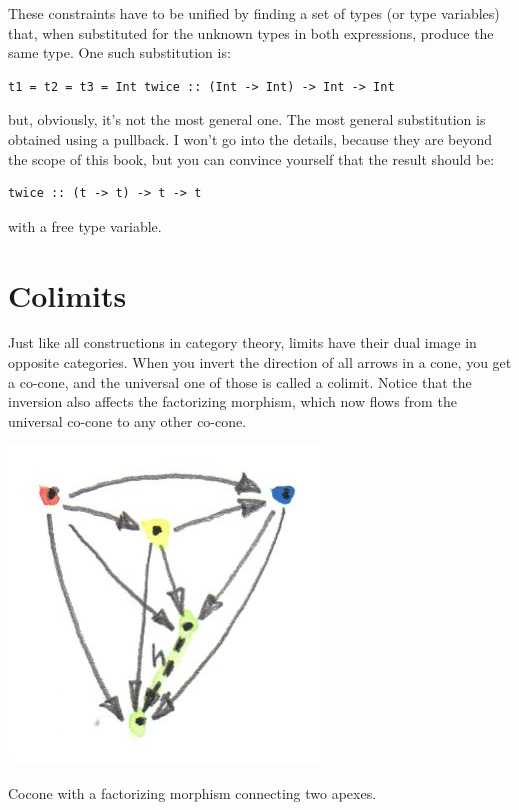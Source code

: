 These constraints have to be unified by finding a set of types (or type
variables) that, when substituted for the unknown types in both
expressions, produce the same type. One such substitution is:

\begin{verbatim}
t1 = t2 = t3 = Int twice :: (Int -> Int) -> Int -> Int
\end{verbatim}

but, obviously, it's not the most general one. The most general
substitution is obtained using a pullback. I won't go into the details,
because they are beyond the scope of this book, but you can convince
yourself that the result should be:

\begin{verbatim}
twice :: (t -> t) -> t -> t
\end{verbatim}

with  a free type variable.

\section{Colimits}\label{colimits}

Just like all constructions in category theory, limits have their dual
image in opposite categories. When you invert the direction of all
arrows in a cone, you get a co-cone, and the universal one of those is
called a colimit. Notice that the inversion also affects the factorizing
morphism, which now flows from the universal co-cone to any other
co-cone.

\hypertarget{attachment_4494}{}
\includegraphics{images/colimit.jpg}

Cocone with a factorizing morphism  connecting two apexes.

